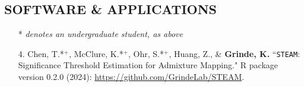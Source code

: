 \documentclass[margin]{res}
\begin{document}
\begin{resume}





\section{SOFTWARE \& APPLICATIONS} 

\begin{itemize}

\item[*] \textit{denotes an undergraduate student, as above}\\
\end{itemize}

\begin{itemize}
\item[4.] Chen, T.*$^{+}$, McClure, K.*$^{+}$, Ohr, S.*$^{+}$, Huang, Z., \& \textbf{Grinde, K.} ``\texttt{STEAM}: Significance Threshold Estimation for Admixture Mapping." R package version 0.2.0 (2024): \href{https://github.com/GrindeLab/STEAM}{https://github.com/GrindeLab/STEAM}.


\end{itemize}
\end{resume}
\end{document}
